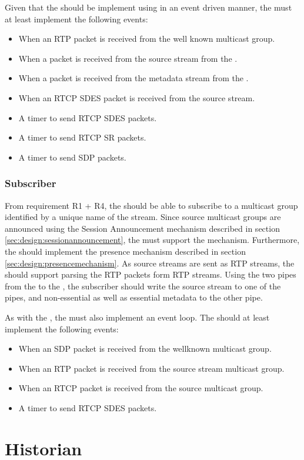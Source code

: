 Given that the \pub{} should be implement using in an event driven manner, the \pub{} must at least implement the following events:

\begin{itemize}
	\item When an RTP packet is received from the well known multicast group.
	\item When a packet is received from the source stream from the \pro{}.
	\item When a packet is received from the metadata stream from the \pro{}.
	\item When an RTCP SDES packet is received from the source stream.
	\item A timer to send RTCP SDES packets.
	\item A timer to send RTCP SR packets.
	\item A timer to send SDP packets.
\end{itemize}

\subsubsection{Subscriber} \label{sec:design:subscriber}
From requirement R1 + R4, the \sub{} should be able to subscribe to a multicast group identified by a unique name of the stream. Since source multicast groups are announced using the Session Announcement mechanism described in section \ref{sec:design:sessionannouncement}, the \sub{} must support the mechanism. Furthermore, the \sub{} should implement the presence mechanism described in section \ref{sec:design:presencemechanism}. As source streams are sent as RTP streams, the \sub{} should support parsing the RTP packets form RTP streams. Using the two pipes from the \sub{} to the \con{}, the subscriber should write the source stream to one of the pipes, and non-essential as well as essential metadata to the other pipe.

As with the \pub{}, the \sub{} must also implement an event loop. The \sub{} should at least implement the following events:

\begin{itemize}
	\item When an SDP packet is received from the wellknown multicast group.
	\item When an RTP packet is received from the source stream multicast group.
	\item When an RTCP packet is received from the source multicast group.
	\item A timer to send RTCP SDES packets.
\end{itemize}

\section{Historian} \label{sec:design:historian}





